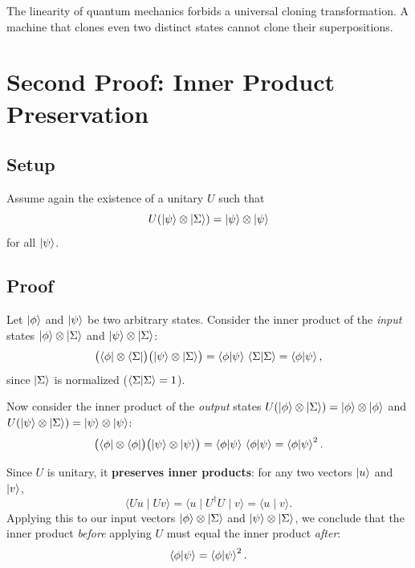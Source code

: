 \documentclass[12pt]{article}
\newcommand{\tensor}{\otimes}
\begin{document}
The linearity of quantum mechanics forbids a universal cloning transformation. A machine that clones even two distinct states cannot clone their superpositions.





\section{Second Proof: Inner Product Preservation}

\subsection{Setup}

Assume again the existence of a unitary $U$ such that
\[
U(\ket{\psi} \tensor \ket{\Sigma}) = \ket{\psi} \tensor \ket{\psi}
\]
for all $\ket{\psi}$.

\subsection{Proof}

Let $\ket{\phi}$ and $\ket{\psi}$ be two arbitrary states. 
Consider the inner product of the \emph{input} states 
$\ket{\phi} \tensor \ket{\Sigma}$ and $\ket{\psi} \tensor \ket{\Sigma}$:
\begin{equation}
\bigl(\bra{\phi} \tensor \bra{\Sigma}\bigr)\bigl(\ket{\psi} \tensor \ket{\Sigma}\bigr)
= \braket{\phi}{\psi}\,\braket{\Sigma}{\Sigma}
= \braket{\phi}{\psi},
\label{eq:innerbefore}
\end{equation}
since $\ket{\Sigma}$ is normalized ($\braket{\Sigma}{\Sigma} = 1$).

Now consider the inner product of the \emph{output} states
$U(\ket{\phi}\tensor\ket{\Sigma}) = \ket{\phi}\tensor\ket{\phi}$
and $U(\ket{\psi}\tensor\ket{\Sigma}) = \ket{\psi}\tensor\ket{\psi}$:
\begin{equation}
\bigl(\bra{\phi} \tensor \bra{\phi}\bigr)\bigl(\ket{\psi} \tensor \ket{\psi}\bigr)
= \braket{\phi}{\psi}\,\braket{\phi}{\psi}
= \braket{\phi}{\psi}^2.
\label{eq:innerafter}
\end{equation}

Since $U$ is unitary, it \textbf{preserves inner products}: for any two vectors 
$\ket{u}$ and $\ket{v}$,
\[
\langle Uu \mid Uv \rangle = \langle u \mid U^\dagger U \mid v \rangle = \langle u \mid v \rangle.
\]
Applying this to our input vectors $\ket{\phi}\tensor\ket{\Sigma}$ 
and $\ket{\psi}\tensor\ket{\Sigma}$, we conclude that the inner product 
\emph{before} applying $U$ must equal the inner product \emph{after}:
\[
\braket{\phi}{\psi} = \braket{\phi}{\psi}^2.
\]
\end{document}
